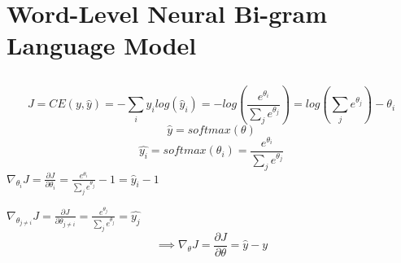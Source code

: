 \documentclass{article}
\begin{document}
\section{Word-Level Neural Bi-gram Language Model}
\subsection{} %
\begin{equation*}
    J = CE(y, \hat{y}) = -\sum_{i} y_{i}log(\hat{y}_{i}) = -log(\frac{e^{\theta_{i}}}{\sum_{j}e^{\theta_{j}}}) = log(\sum_{j}e^{\theta_{j}}) - \theta_{i}
\end{equation*}
\begin{equation*}
\hat{y} = softmax(\theta)
\end{equation*}
\begin{equation*}
\hat{y_{i}} = softmax(\theta_{i}) = \frac{e^{\theta_{i}}}{\sum_{j}e^{\theta_{j}}}
\end{equation*}
$\nabla_{\theta_{i}} J = \frac{\partial J}{\partial \theta_{i}} = \frac{e^{\theta_{i}}}{\sum_{j}e^{\theta_{j}}} -1 =\hat{y}_{i} -1 $

$\nabla_{\theta_{j \neq i}} J = \frac{\partial J}{\partial \theta_{j \neq i}} = \frac{e^{\theta_{j}}}{\sum_{j}e^{\theta_{j}}} = \hat{y_{j}}$
\begin{equation*}
\implies \nabla_{\theta} J = \frac{\partial J}{\partial \theta} = \hat{y} - y
\end{equation*}
\end{document}
